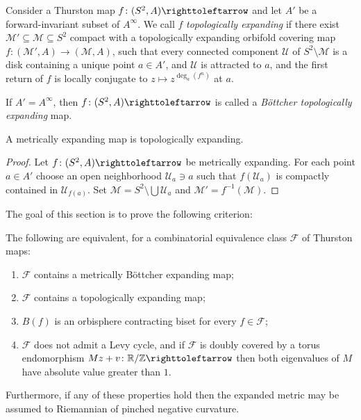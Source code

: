 \documentclass{amsart}
\begin{document}
\begin{defn}\label{defn:TopExp}
  Consider a Thurston map $f\colon(S^2,A)\selfmap$ and let $A'$ be a
  forward-invariant subset of $A^\infty$. We call $f$
  \emph{topologically expanding} if there exist
  $\mathcal M'\subseteq \mathcal M\subseteq S^2$ compact with a
  topologically expanding orbifold covering map
  $f\colon (\mathcal M',A)\to (\mathcal M,A)$, such that every
  connected component $\mathcal U$ of $S^2\setminus \mathcal M$ is a
  disk containing a unique point $a\in A'$, and $\mathcal U$ is
  attracted to $a$, and the first return of $f$ is locally conjugate
  to $z\mapsto z^{\deg_a(f ^n)}$ at $a$.

  If $A'=A^\infty$, then $f\colon (S^2,A)\selfmap$ is called a
  \emph{B\"ottcher topologically expanding} map.
\end{defn}

\begin{prop}\label{prop:metr=>top}
  A metrically expanding map is topologically expanding.
\end{prop}
\begin{proof}
  Let $f\colon(S^2,A)\selfmap$ be metrically expanding. For each point
  $a\in A'$ choose an open neighborhood $\mathcal U_a\ni a$ such that
  $f(\mathcal U_a)$ is compactly contained in $\mathcal U_{f(a)}$. Set
  $\mathcal M=S^2\setminus\bigcup\mathcal U_a$ and
  $\mathcal M'=f^{-1}(\mathcal M)$.
\end{proof}

\noindent The goal of this section is to prove the following criterion:
\begin{thm}\label{thm:ExpCr}
  The following are equivalent, for a combinatorial equivalence class
  $\mathscr F$ of Thurston maps:
  \begin{enumerate}
  \item $\mathscr F$ contains a metrically B\"ottcher expanding map;\label{thm:ExpCr:1}
  \item $\mathscr F$ contains a topologically expanding map;\label{thm:ExpCr:3}
  \item $B(f)$ is an orbisphere contracting biset for every
    $f\in\mathscr F$;\label{thm:ExpCr:4}
  \item $\mathscr F$ does not admit a Levy cycle, and if $\mathscr F$
    is doubly covered by a torus endomorphism
    $M z+v \colon \R/\Z \selfmap$ then both eigenvalues of $M$ have
    absolute value greater than $1$. \label{thm:ExpCr:5}
  \end{enumerate}

  Furthermore, if any of these properties hold then the expanded
  metric may be assumed to Riemannian of pinched negative curvature.
\end{thm}
\end{document}
